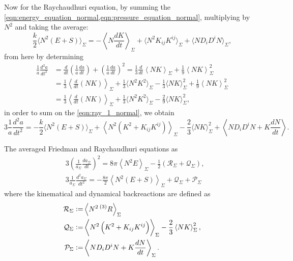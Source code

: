 Now for the Raychaudhuri equation, by summing the \cref{eqn:energy_equation_normal,eqn:pressure_equation_normal}, multiplying by $N^2$ and taking the average:
\begin{equation}
    \frac{k}{2}\langle N^2(E+S)\rangle_\Sigma=-\left\langle N\frac{dK}{dt}\right\rangle_\Sigma+\langle N^2K_{ij}K^{ij}\rangle_\Sigma+\langle ND_iD^iN\rangle_\Sigma,
    \label{eqn:ray_1_normal}
\end{equation}
from here by determining
\begin{align}
    \frac{1}{a}\frac{d^2a}{dt^2}&=\frac{d}{dt}\left(\frac{1}{a}\frac{da}{dt}\right)+\left(\frac{1}{a}\frac{da}{dt}\right)^2=\frac{1}{3}\frac{d}{dt}\left\langle NK \right\rangle_{\Sigma}+\frac{1}{9}\left\langle NK \right\rangle_{\Sigma}^2\nonumber\\
    &=\frac{1}{3}\left\langle \frac{d}{dt}(NK) \right\rangle_{\Sigma}+\frac{1}{3}\langle N^2K^2\rangle_{\Sigma}-\frac{1}{3}\langle NK\rangle^2_\Sigma+\frac{1}{9}\left\langle NK \right\rangle_{\Sigma}^2\nonumber\\
    &=\frac{1}{3}\left\langle \frac{d}{dt}(NK) \right\rangle_{\Sigma}+\frac{1}{3}\langle N^2K^2\rangle_{\Sigma}-\frac{2}{9}\langle NK\rangle^2_\Sigma,
    \label{eqn:useful_51}
\end{align}
in order to sum on the \cref{eqn:ray_1_normal}, we obtain
\begin{equation}
    3\frac{1}{a}\frac{d^2a}{dt^2}=-\frac{k}{2}\langle N^2(E+S)\rangle_\Sigma+\left\langle N^2(K^2+K_{ij}K^{ij})\right\rangle_{\Sigma}-\frac{2}{3}\langle NK\rangle^2_\Sigma+\left\langle ND_iD^i N+K\frac{dN}{dt}\right\rangle.\nonumber
\end{equation}





The averaged Friedman and Raychaudhuri equations as
\begin{align}
    &3\left(\frac{1}{a_\Sigma}\frac{da_\Sigma}{dt}\right)^2=8\pi\left\langle N^2E\right\rangle_{\Sigma}-\frac{1}{2}\left(\mathcal{R}_\Sigma+\mathcal{Q}_{\Sigma}\right),\label{eqn:friedman_eqs_jf_1}\\
    &3\frac{1}{a_{\Sigma}}\frac{d^2a_{\Sigma}}{dt^2}=-\frac{8\pi}{2}\left\langle N^2(E+S)\right\rangle_{\Sigma}+\mathcal{Q}_{\Sigma}+\mathcal{P}_{\Sigma}\label{eqn:raychaud_eqs_jf_1}
\end{align}
where the kinematical and dynamical backreactions are defined as
\begin{align}
    \mathcal{R}_\Sigma :=&\left\langle N^2 \prescript{(3)}{}{R}\right\rangle_{\Sigma}\\
    \mathcal{Q}_{\Sigma}:=& \left\langle N^2\left(K^2+K_{ij}K^{ij}\right)\right\rangle_{\Sigma}-\frac{2}{3}\left\langle NK\right\rangle_{\Sigma}^2, \\
    \mathcal{P}_{\Sigma}:= &\left\langle N D_i D^i N+K\frac{dN}{dt}\right\rangle_{\Sigma}.
\end{align}





